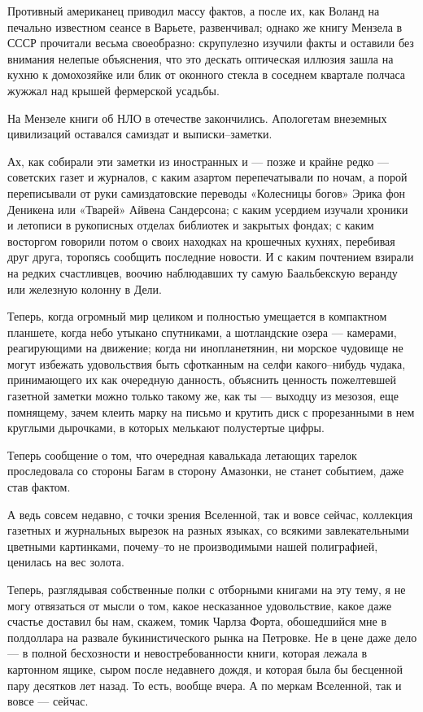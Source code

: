 Противный американец приводил массу фактов, а после их, как Воланд на печально
известном сеансе в Варьете, развенчивал; однако же книгу Мензела в СССР
прочитали весьма своеобразно: скрупулезно изучили факты и оставили без внимания
нелепые объяснения, что это дескать оптическая иллюзия зашла на кухню к
домохозяйке или блик от оконного стекла в соседнем квартале полчаса жужжал над
крышей фермерской усадьбы.

На Мензеле книги об НЛО в отечестве закончились. Апологетам внеземных
цивилизаций оставался самиздат и выписки–заметки.

Ах, как собирали эти заметки из иностранных и — позже и крайне редко —
советских газет и журналов, с каким азартом перепечатывали по ночам, а порой
переписывали от руки самиздатовские переводы «Колесницы богов» Эрика фон
Деникена или «Тварей» Айвена Сандерсона; с каким усердием изучали хроники и
летописи в рукописных отделах библиотек и закрытых фондах; с каким восторгом
говорили потом о своих находках на крошечных кухнях, перебивая друг друга,
торопясь сообщить последние новости. И с каким почтением взирали на редких
счастливцев, воочию наблюдавших ту самую Баальбекскую веранду или железную
колонну в Дели.

Теперь, когда огромный мир целиком и полностью умещается в компактном планшете,
когда небо утыкано спутниками, а шотландские озера — камерами, реагирующими на
движение; когда ни инопланетянин, ни морское чудовище не могут избежать
удовольствия быть сфотканным на селфи какого–нибудь чудака, принимающего их как
очередную данность, объяснить ценность пожелтевшей газетной заметки можно
только такому же, как ты — выходцу из мезозоя, еще помнящему, зачем клеить
марку на письмо и крутить диск с прорезанными в нем круглыми дырочками, в
которых мелькают полустертые цифры.

Теперь сообщение о том, что очередная кавалькада летающих тарелок проследовала
со стороны Багам в сторону Амазонки, не станет событием, даже став фактом.

А ведь совсем недавно, с точки зрения Вселенной, так и вовсе сейчас, коллекция
газетных и журнальных вырезок на разных языках, со всякими завлекательными
цветными картинками, почему–то не производимыми нашей полиграфией, ценилась на
вес золота.

Теперь, разглядывая собственные полки с отборными книгами на эту тему, я не
могу отвязаться от мысли о том, какое несказанное удовольствие, какое даже
счастье доставил бы нам, скажем, томик Чарлза Форта, обошедшийся мне в
полдоллара на развале букинистического рынка на Петровке. Не в цене даже дело —
в полной бесхозности и невостребованности книги, которая лежала в картонном
ящике, сыром после недавнего дождя, и которая была бы бесценной пару десятков
лет назад. То есть, вообще вчера. А по меркам Вселенной, так и вовсе — сейчас.

